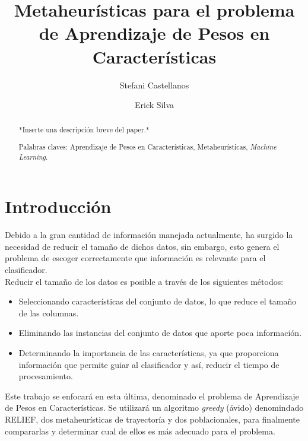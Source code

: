 \documentclass{ci5652}
\title{Metaheurísticas para el problema de Aprendizaje de Pesos en Características}
\author{Stefani Castellanos
        \and
        Erick Silva}
\begin{document}
\thispagestyle{empty}
\maketitle


\begin{abstract}
*Inserte una descripción breve del paper.*

Palabras claves: Aprendizaje de Pesos en Características, Metaheurísticas,
\textit{Machine Learning}.
\end{abstract}


\section*{Introducción}
Debido a la gran cantidad de información manejada actualmente, ha surgido la
necesidad de reducir el tamaño de dichos datos, sin embargo, esto genera el
problema de escoger correctamente que información es relevante para el
clasificador.\cite{Cano_2003} \\

Reducir el tamaño de los datos es posible a través de los siguientes métodos:

\begin{itemize}
  \item Seleccionando características del conjunto de datos, lo que reduce el
  tamaño de las columnas.
  \item Eliminando las instancias del conjunto de datos que aporte poca
  información.
  \item Determinando la importancia de las características, ya que proporciona
  información que permite guiar al clasificador y así, reducir el tiempo de
  procesamiento.
\end{itemize}

Este trabajo se enfocará en esta última, denominado el problema de Aprendizaje
de Pesos en Características. Se utilizará un algoritmo \textit{greedy} (ávido)
denomindado RELIEF, dos metaheurísticas de trayectoría y dos poblacionales,
para finalmente compararlas y determinar cual de ellos es más adecuado para el
problema.
\end{document}
